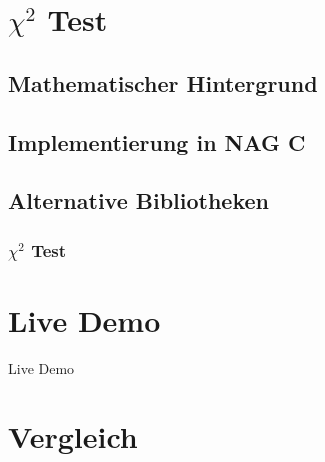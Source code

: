 \documentclass{beamer}
\begin{document}
\section{$\chi^2$ Test}
\subsection{Mathematischer Hintergrund}
\subsection{Implementierung in NAG C}
\subsection{Alternative Bibliotheken}
\begin{frame}
\frametitle{$\chi^2$ Test}
\end{frame}

\section{Live Demo}

\begin{frame}{\insertsection}
\center
\Huge Live Demo
\end{frame}

\section{Vergleich}
\end{document}
